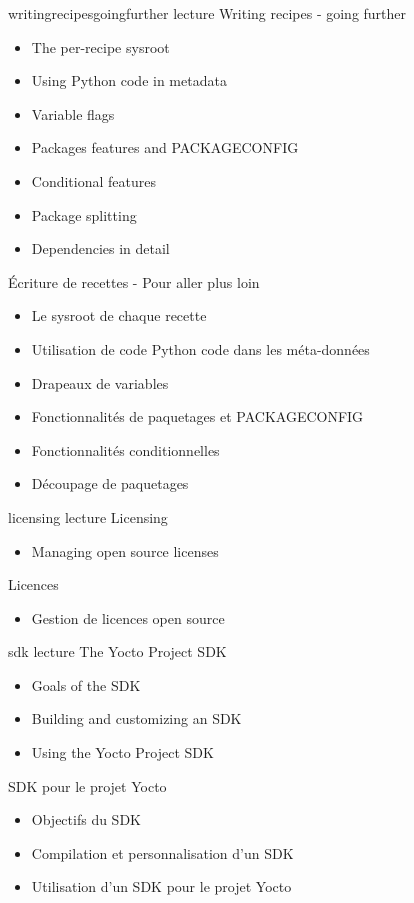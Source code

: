 {writingrecipesgoingfurther}
{lecture}
{Writing recipes - going further}
{
  \begin{itemize}
  \item The per-recipe sysroot
  \item Using Python code in metadata
  \item Variable flags
  \item Packages features and PACKAGECONFIG
  \item Conditional features
  \item Package splitting
  \item Dependencies in detail
  \end{itemize}
}
{Écriture de recettes - Pour aller plus loin}
{
  \begin{itemize}
  \item Le sysroot de chaque recette
  \item Utilisation de code Python code dans les méta-données
  \item Drapeaux de variables
  \item Fonctionnalités de paquetages et PACKAGECONFIG
  \item Fonctionnalités conditionnelles
  \item Découpage de paquetages
  \end{itemize}
}

{licensing}
{lecture}
{Licensing}
{
  \begin{itemize}
  \item Managing open source licenses
  \end{itemize}
}
{Licences}
{
  \begin{itemize}
  \item Gestion de licences open source
  \end{itemize}
}

{sdk}
{lecture}
{The Yocto Project SDK}
{
  \begin{itemize}
  \item Goals of the SDK
  \item Building and customizing an SDK
  \item Using the Yocto Project SDK
  \end{itemize}
}
{SDK pour le projet Yocto}
{
  \begin{itemize}
  \item Objectifs du SDK
  \item Compilation et personnalisation d'un SDK
  \item Utilisation d'un SDK pour le projet Yocto
  \end{itemize}
}

